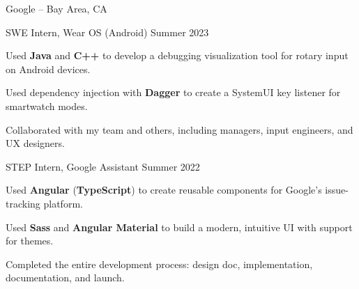 \begin{entry}{Google -- Bay Area, CA}

	\entryItem
		{SWE Intern, Wear OS (Android)}
		{Summer 2023}
	
		\begin{items}
			\item Used \textbf{Java} and \textbf{C++} to develop a debugging visualization tool for rotary input on Android devices.
			\item Used dependency injection with \textbf{Dagger} to create a SystemUI key listener for smartwatch modes.
			\item Collaborated with my team and others, including managers, input engineers, and UX designers.
		\end{items}

	\entryItem
		{STEP Intern, Google Assistant}
		{Summer 2022}

		\begin{items}
			\item Used \textbf{Angular} (\textbf{TypeScript}) to create reusable components for Google's issue-tracking platform.
			\item Used \textbf{Sass} and \textbf{Angular Material} to build a modern, intuitive UI with support for themes.
			\item Completed the entire development process: design doc, implementation, documentation, and launch.
		\end{items}

\end{entry}
